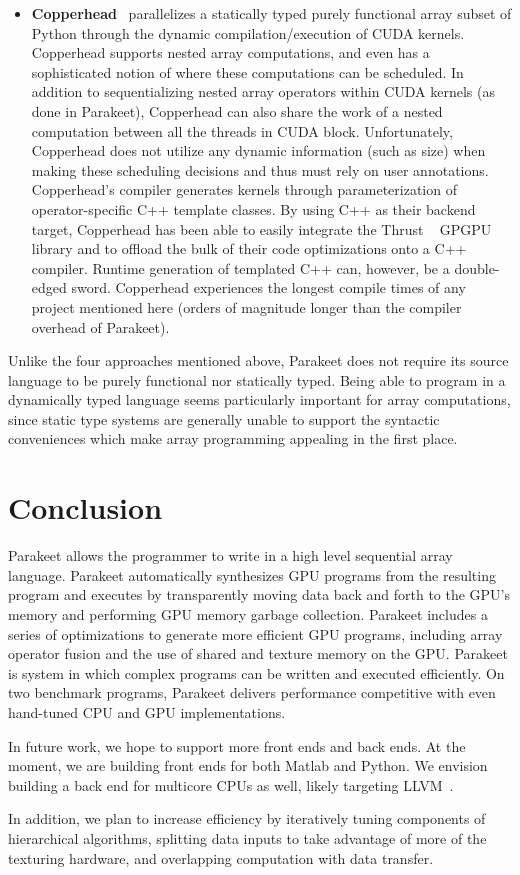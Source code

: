 \documentclass[preprint]{sigplanconf}
\begin{document}
\begin{itemize}
\item \textbf{Copperhead}~\cite{Cata10} parallelizes a statically typed purely functional array subset of Python through the dynamic compilation/execution of CUDA kernels. Copperhead supports nested array computations, and even has a sophisticated notion of where these computations can be scheduled. In addition
to sequentializing nested array operators within CUDA kernels (as done in Parakeet), Copperhead can also share the work of a nested computation between all the threads in CUDA block. Unfortunately, Copperhead does not utilize any dynamic information (such as size) when making these scheduling decisions and
thus must rely on user annotations. Copperhead's compiler generates kernels through parameterization of operator-specific C++ template classes. By using C++ as their backend target, Copperhead has been able to easily integrate the Thrust ~\cite{Hobe10} GPGPU library and to offload the bulk of their code optimizations onto a C++ compiler. Runtime generation of templated C++ can, however, be a double-edged sword. Copperhead experiences the longest compile times of any project mentioned here (orders of magnitude longer than the compiler overhead of Parakeet).
\end{itemize}
Unlike the four approaches mentioned above, Parakeet does not require its source language to be purely functional nor statically typed. Being able to program in a dynamically typed language seems particularly important for array computations, since static type systems are generally unable to support the syntactic conveniences which make array programming appealing in the first place.

\section{Conclusion}
\label{Conclusion}

Parakeet allows the programmer to write in a high level sequential array language. Parakeet automatically synthesizes GPU programs from the resulting program and executes by transparently moving data back and
forth to the GPU's memory and performing GPU memory garbage collection. Parakeet includes a series of optimizations to generate more efficient GPU programs, including array operator fusion and the use of shared and texture memory on the GPU.  Parakeet is system in which complex programs can be written and executed efficiently.  On two benchmark programs, Parakeet delivers performance competitive with even hand-tuned CPU and GPU implementations.

In future work, we hope to support more front ends and back ends.  At the moment, we are building front ends for both Matlab and Python.  We envision building a back end for multicore CPUs as well, likely targeting LLVM~\cite{Latt02}.

In addition, we plan to increase efficiency by iteratively tuning components of hierarchical algorithms, splitting data inputs to take advantage of more of the texturing hardware, and overlapping computation with data transfer.


{}
\end{document}

